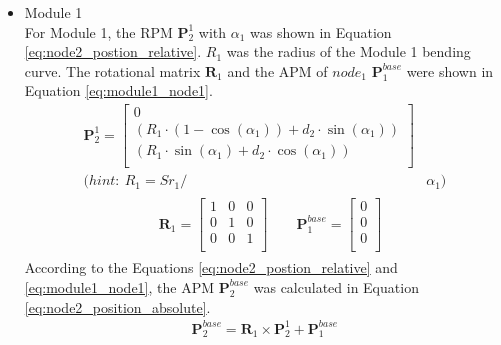 \begin{itemize}
    \item Module 1 \\
    For Module 1, the RPM $\textbf{P}_{2}^{1}$ with $\alpha_1$ was shown 
    in Equation \ref{eq:node2_postion_relative}. $R_1$ was the radius of the Module 1 bending curve. The rotational 
    matrix $\textbf{R}_{1}$ and the APM of $node_1$ $\textbf{P}_{1}^{base}$ were shown in Equation 
    \ref*{eq:module1_node1}.
    \begin{align}
        \textbf{P}_{2}^{1} = 
        \begin{bmatrix}
            0 \\
            (R_1\cdot(1-\cos(\alpha_1)) + d_2\cdot \sin(\alpha_1)) \\
            (R_1\cdot \sin(\alpha_1) + d_2\cdot \cos(\alpha_1)) \\
        \end{bmatrix}&
        \label{eq:node2_postion_relative} \\
        \nonumber (hint: \ R_1 = {Sr}_1/ &\alpha_1)
    \end{align}
    \vspace{-15mm}
    \begin{align}
        &\begin{aligned}
            \textbf{R}_{1} = 
            \begin{bmatrix}
                1 & 0 & 0 \\
                0 & 1 & 0 \\
                0 & 0 & 1 \\
            \end{bmatrix}
            \qquad
            \textbf{P}_{1}^{base} = 
            \begin{bmatrix}
                0 \\ 0 \\ 0\\
            \end{bmatrix}
        \end{aligned}
        \label{eq:module1_node1} 
    \end{align}
    According to the Equations \ref{eq:node2_postion_relative} and \ref{eq:module1_node1}, the APM 
    $\textbf{P}_{2}^{base}$ was calculated in Equation \ref{eq:node2_position_absolute}.
    \begin{align}
        \textbf{P}_{2}^{base} = \textbf{R}_{1} \times \textbf{P}_{2}^{1} + \textbf{P}_{1}^{base}
        \label{eq:node2_position_absolute}
    \end{align}

\end{itemize}
